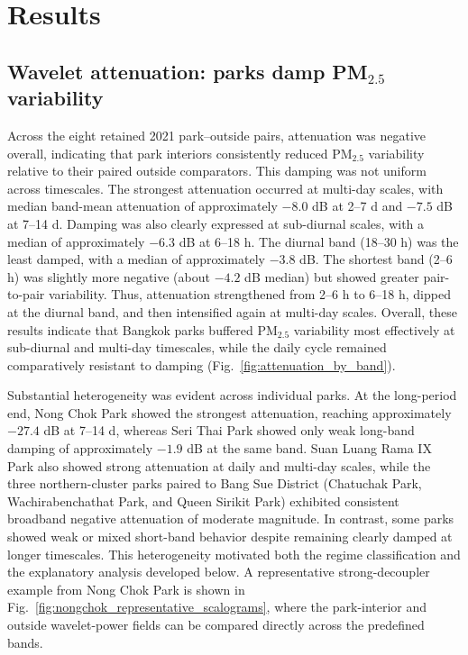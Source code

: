 \section{Results}

\subsection{Wavelet attenuation: parks damp PM$_{2.5}$ variability}

Across the eight retained 2021 park--outside pairs, attenuation was negative overall, indicating that park interiors consistently reduced PM$_{2.5}$ variability relative to their paired outside comparators. This damping was not uniform across timescales. The strongest attenuation occurred at multi-day scales, with median band-mean attenuation of approximately $-8.0$ dB at 2--7 d and $-7.5$ dB at 7--14 d. Damping was also clearly expressed at sub-diurnal scales, with a median of approximately $-6.3$ dB at 6--18 h. The diurnal band (18--30 h) was the least damped, with a median of approximately $-3.8$ dB. The shortest band (2--6 h) was slightly more negative (about $-4.2$ dB median) but showed greater pair-to-pair variability. Thus, attenuation strengthened from 2--6 h to 6--18 h, dipped at the diurnal band, and then intensified again at multi-day scales. Overall, these results indicate that Bangkok parks buffered PM$_{2.5}$ variability most effectively at sub-diurnal and multi-day timescales, while the daily cycle remained comparatively resistant to damping (Fig.~\ref{fig:attenuation_by_band}).

Substantial heterogeneity was evident across individual parks. At the long-period end, Nong Chok Park showed the strongest attenuation, reaching approximately $-27.4$ dB at 7--14 d, whereas Seri Thai Park showed only weak long-band damping of approximately $-1.9$ dB at the same band. Suan Luang Rama IX Park also showed strong attenuation at daily and multi-day scales, while the three northern-cluster parks paired to Bang Sue District (Chatuchak Park, Wachirabenchathat Park, and Queen Sirikit Park) exhibited consistent broadband negative attenuation of moderate magnitude. In contrast, some parks showed weak or mixed short-band behavior despite remaining clearly damped at longer timescales. This heterogeneity motivated both the regime classification and the explanatory analysis developed below. A representative strong-decoupler example from Nong Chok Park is shown in Fig.~\ref{fig:nongchok_representative_scalograms}, where the park-interior and outside wavelet-power fields can be compared directly across the predefined bands.

